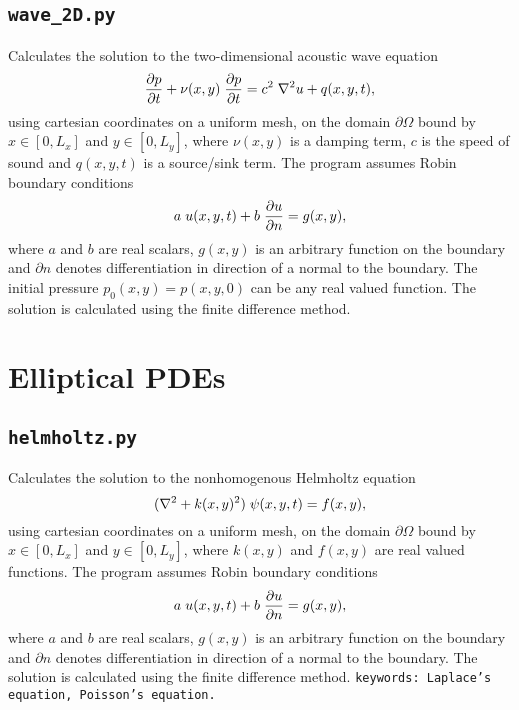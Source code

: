 \documentclass{article}
\begin{document}
\subsection{\texttt{wave\_2D.py}} 
Calculates the solution to the two-dimensional acoustic wave equation
\begin{equation*}
\frac{\partial p}{\partial t} + \nu(x,y) \hspace{0.1cm} \frac{\partial p}{\partial t} = c^2 \hspace{0.1cm} \nabla^{2} u + q(x,y,t),
\end{equation*}
using cartesian coordinates on a uniform mesh, on the domain $\partial \Omega$ bound by $x \in [0,L_x]$ and $y \in [0,L_y]$, where $\nu(x,y)$ is a damping term, $c$ is the speed of sound and $q(x,y,t)$ is a source/sink term. The program assumes Robin boundary conditions
\begin{equation*}
a \hspace{0.1cm} u(x,y,t) + b \hspace{0.1cm} \frac{\partial u}{\partial n} = g(x,y),
\end{equation*}
where $a$ and $b$ are real scalars, $g(x,y)$ is an arbitrary function on the boundary and $\partial n$ denotes differentiation in direction of a normal to the boundary. The initial pressure $p_0(x,y)=p(x,y,0)$ can be any real valued function. The solution is calculated using the finite difference method.

\section{Elliptical PDEs}
\subsection{\texttt{helmholtz.py}} 
Calculates the solution to the nonhomogenous Helmholtz equation
\begin{equation*}
(\nabla^2 + k(x,y)^2) \hspace{0.1cm} \psi(x,y,t) = f(x,y),
\end{equation*}
using cartesian coordinates on a uniform mesh, on the domain $\partial \Omega$ bound by \newline $x \in [0,L_x]$ and $y \in [0,L_y]$, where $k(x,y)$ and $f(x,y)$ are real valued functions. The program assumes Robin boundary conditions
\begin{equation*}
a \hspace{0.1cm} u(x,y,t) + b \hspace{0.1cm} \frac{\partial u}{\partial n} = g(x,y),
\end{equation*}
where $a$ and $b$ are real scalars, $g(x,y)$ is an arbitrary function on the boundary and $\partial n$ denotes differentiation in direction of a normal to the boundary. The solution is calculated using the finite difference method. \newline
\newline
\texttt{keywords: Laplace's equation, Poisson's equation.}
\end{document}
